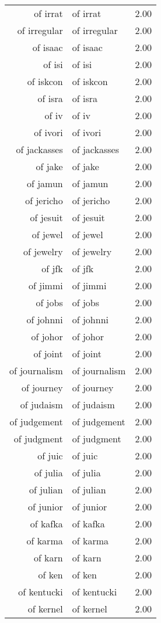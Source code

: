 \begin{table}[ht]
\begin{tabular}{rlr}
  of irrat & of irrat & 2.00 \\ 
  of irregular & of irregular & 2.00 \\ 
  of isaac & of isaac & 2.00 \\ 
  of isi & of isi & 2.00 \\ 
  of iskcon & of iskcon & 2.00 \\ 
  of isra & of isra & 2.00 \\ 
  of iv & of iv & 2.00 \\ 
  of ivori & of ivori & 2.00 \\ 
  of jackasses & of jackasses & 2.00 \\ 
  of jake & of jake & 2.00 \\ 
  of jamun & of jamun & 2.00 \\ 
  of jericho & of jericho & 2.00 \\ 
  of jesuit & of jesuit & 2.00 \\ 
  of jewel & of jewel & 2.00 \\ 
  of jewelry & of jewelry & 2.00 \\ 
  of jfk & of jfk & 2.00 \\ 
  of jimmi & of jimmi & 2.00 \\ 
  of jobs & of jobs & 2.00 \\ 
  of johnni & of johnni & 2.00 \\ 
  of johor & of johor & 2.00 \\ 
  of joint & of joint & 2.00 \\ 
  of journalism & of journalism & 2.00 \\ 
  of journey & of journey & 2.00 \\ 
  of judaism & of judaism & 2.00 \\ 
  of judgement & of judgement & 2.00 \\ 
  of judgment & of judgment & 2.00 \\ 
  of juic & of juic & 2.00 \\ 
  of julia & of julia & 2.00 \\ 
  of julian & of julian & 2.00 \\ 
  of junior & of junior & 2.00 \\ 
  of kafka & of kafka & 2.00 \\ 
  of karma & of karma & 2.00 \\ 
  of karn & of karn & 2.00 \\ 
  of ken & of ken & 2.00 \\ 
  of kentucki & of kentucki & 2.00 \\ 
  of kernel & of kernel & 2.00 \\ 

\end{tabular}
\end{table}
